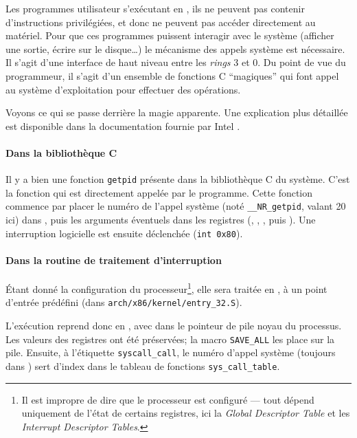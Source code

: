 \label{sec:impl-syscall}

Les programmes utilisateur s'exécutant en , ils ne peuvent pas contenir
d'instructions privilégiées, et donc ne peuvent pas accéder directement au
matériel. Pour que ces programmes puissent interagir avec le système (afficher
une sortie, écrire sur le disque…) le mécanisme des appels système est
nécessaire. Il s'agit d'une interface de haut niveau entre les \emph{rings} 3 et
0. Du point de vue du programmeur, il s'agit d'un ensemble de fonctions C
\enquote{magiques} qui font appel au système d'exploitation pour effectuer des
opérations.

Voyons ce qui se passe derrière la magie apparente. Une explication plus
détaillée est disponible dans la documentation fournie par Intel
\cite{intelsys}.

\paragraph{Dans la bibliothèque C}

Il y a bien une fonction \texttt{getpid} présente dans la bibliothèque C du
système. C'est la fonction qui est directement appelée par le programme. Cette
fonction commence par placer le numéro de l'appel système (noté
\texttt{\_\_NR\_getpid}, valant 20 ici) dans \eax, puis les arguments éventuels
dans les registres (\ebx, \ecx, \edx, \esi{} puis \edi). Une interruption
logicielle est ensuite déclenchée (\verb!int 0x80!).

\paragraph{Dans la routine de traitement d'interruption}

Étant donné la configuration du processeur\footnote{Il est impropre de dire que
le processeur est configuré --- tout dépend uniquement de l'état de certains
registres, ici la \emph{Global Descriptor Table} et les \emph{Interrupt
Descriptor Tables}.}, elle sera traitée en , à un point d'entrée
prédéfini (dans \verb!arch/x86/kernel/entry_32.S!).


L'exécution reprend donc en , avec dans \esp{} le pointeur de pile noyau
du processus. Les valeurs des registres ont été préservées; la macro
\texttt{SAVE\_ALL} les place sur la pile. Ensuite, à l'étiquette
\texttt{syscall\_call}, le numéro d'appel système (toujours dans \eax) sert
d'index dans le tableau de fonctions \texttt{sys\_call\_table}.


